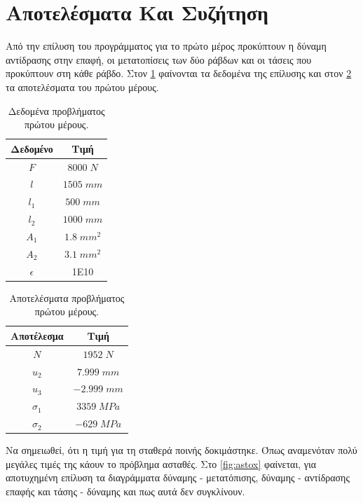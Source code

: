 \documentclass{article}
\begin{document}
\section{Αποτελέσματα Και Συζήτηση}
Από την επίλυση του προγράμματος για το πρώτο μέρος προκύπτουν η δύναμη αντίδρασης στην επαφή, οι μετατοπίσεις των δύο ράβδων και οι τάσεις που προκύπτουν στη κάθε ράβδο. Στον \ref{tab:ded} φαίνονται τα δεδομένα της επίλυσης και στον \ref{tab:apot} τα αποτελέσματα του πρώτου μέρους.
\begin{table}[H]
    \centering
    \begin{tabular}{|c|c|}
        \hline
        \rowcolor{Dandelion}
        Δεδομένο & Τιμή\\ \hline
        $F$ & $8000\; N$\\ \hline
        $l$ & $1505\; mm$\\ \hline
        $l_1$ & $500\; mm$\\ \hline
        $l_2$ & $1000\; mm$\\ \hline
        $A_1$ & $1.8\; mm^2$\\ \hline
        $A_2$ & $3.1\; mm^2$\\ \hline
        $\epsilon$ & 1E10 \\ \hline
    \end{tabular}
    \caption{Δεδομένα προβλήματος πρώτου μέρους.}
    \label{tab:ded}
\end{table}

\begin{table}[H]
    \centering
    \begin{tabular}{|c|c|}
        \hline
        \rowcolor{yellow}
        Αποτέλεσμα & Τιμή\\ \hline
        $N$ & $1952\; N$\\ \hline
        $u_2$ & $7.999\; mm$\\ \hline
        $u_3$ & $-2.999\; mm$\\ \hline
        $\sigma_1$ & $3359\; MPa$\\ \hline
        $\sigma_2$ & $-629\; MPa$\\ \hline
    \end{tabular}
    \caption{Αποτελέσματα προβλήματος πρώτου μέρους.}
    \label{tab:apot}
\end{table}

Να σημειωθεί, ότι η τιμή για τη σταθερά ποινής δοκιμάστηκε. Όπως αναμενόταν πολύ μεγάλες τιμές της κάουν το πρόβλημα ασταθές. Στο \ref{fig:astox} φαίνεται, για αποτυχημένη επίλυση τα διαγράμματα δύναμης - μετατόπισης, δύναμης - αντίδρασης επαφής και τάσης - δύναμης και πως αυτά δεν συγκλίνουν.
\end{document}
